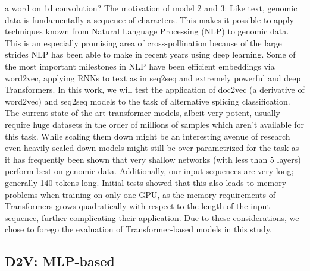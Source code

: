 a word on 1d convolution?
The motivation of model 2 and 3:
Like text, genomic data is fundamentally a sequence of characters.
This makes it possible to apply techniques known from Natural Language Processing (NLP) to genomic data. This is an especially promising area of cross-pollination because of the large strides NLP has been able to make in recent years using deep learning.
Some of the most important milestones in NLP have been efficient embeddings via word2vec, applying RNNs to text as in seq2seq and extremely powerful and deep Transformers.
In this work, we will test the application of doc2vec (a derivative of word2vec) and seq2seq models to the task of alternative splicing classification. The current state-of-the-art transformer models, albeit very potent, usually require huge datasets in the order of millions of samples which aren't available for this task. While scaling them down might be an interesting avenue of research even heavily scaled-down models might still be over parametrized for the task as it has frequently been shown that very shallow networks (with less than 5 layers) perform best on genomic data. Additionally, our input sequences are very long; generally 140 tokens long. Initial tests showed that this also leads to memory problems when training on only one GPU, as the memory requirements of Transformers grows quadratically with respect to the length of the input sequence, further complicating their application. Due to these considerations, we chose to forego the evaluation of Transformer-based models in this study.
\subsection{D2V: MLP-based} \label{subsec:d2v}
